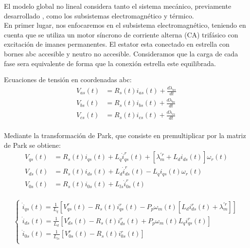 \documentclass{article}
\begin{document}
El modelo global no lineal considera tanto el sistema mecánico, previamente desarrollado
, como los subsistemas electromagnético y térmico.\\

En primer lugar, nos enfocaremos en el subsistema electromagnético, teniendo en cuenta que 
se utiliza un motor síncrono de corriente alterna (CA) trifásico con excitación de imanes 
permanentes. El estator esta conectado en estrella con bornes abc accesible y neutro no accesible.
Consideramos que la carga de cada fase sera equivalente de forma que la conexión estrella este equilibrada.

Ecuaciones de tensión en coordenadas abc:
\begin{equation}
    \begin{aligned}
        V_{as}(t) &= R_{s}(t)i_{as}(t) + \frac{d\lambda_{as}}{dt}\\
        V_{bs}(t) &= R_{s}(t)i_{bs}(t) + \frac{d\lambda_{bs}}{dt}\\
        V_{cs}(t) &= R_{s}(t)i_{cs}(t) + \frac{d\lambda_{cs}}{dt}\\
    \end{aligned}
\end{equation}

Mediante la transformación de Park, que consiste en premultiplicar por la matriz de Park se obtiene:
\begin{equation}
    \begin{aligned}
        V_{qs}(t) &= R_{s}(t)i_{qs}(t) + L_{q}\dot{i}_{qs}^r(t) + [\lambda_{m}^{\prime r} + L_{d}i_{ds}(t)]\omega_{r}(t)\\
        V_{ds}(t) &= R_{s}(t)i_{ds}(t) + L_{d}\dot{i}_{ds}^r(t)  - L_{q}i_{qs}(t)\omega_{r}(t)\\
        V_{0s}(t) &= R_{s}(t)i_{0s}(t) + L_{ls}\dot{i}_{0s}^r(t) \\
    \end{aligned}
\end{equation}

\begin{equation}\label{eq:mi_ecuacion}
    \begin{cases}
        \dot{i}_{qs}(t) = \frac{1}{L_{q}}[V_{qs}^r(t) - R_{s}(t)i_{qs}^r(t) - P_{p}\omega_{m}(t)[L_{d}i_{ds}^r(t)+\lambda_{m}^{\prime r}]]  \\
        \dot{i}_{ds}(t) = \frac{1}{L_{d}}[V_{ds}^r(t) - R_{s}(t)i_{ds}^r(t) + P_{p}\omega_{m}(t)L_{q}i_{qs}^r(t)]  \\
        \dot{i}_{0s}(t) = \frac{1}{L_{ls}}[V_{0s}^r(t) - R_{s}(t)i_{0s}^r(t)]  \\
    \end{cases}
\end{equation}
\end{document}
